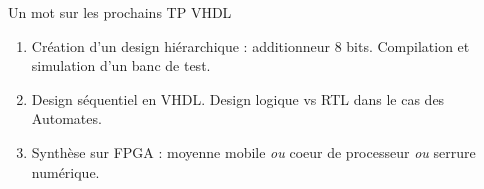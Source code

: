 \documentclass[xcolor=table]{beamer} %
\begin{document}
\begin{frame}{Un mot sur les prochains TP VHDL}
  \begin{enumerate}
    \item Création d'un design hiérarchique : additionneur 8 bits. Compilation et simulation d'un banc de test.
    \item Design séquentiel en VHDL. Design logique vs RTL dans le cas des Automates.
    \item Synthèse sur FPGA : moyenne mobile {\it ou} coeur de processeur {\it ou} serrure numérique.
  \end{enumerate}
\end{frame}
\end{document}
